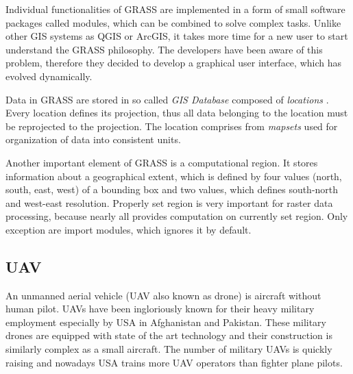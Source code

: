 \documentclass[a4paper,12pt]{article}
\newcommand{\term}[1]{
{\it #1}%
}
\begin{document}
Individual functionalities of GRASS are implemented in a form of small software packages called modules, which 
can be combined to solve complex tasks.
Unlike other GIS systems as QGIS or ArcGIS, it takes 
more time for a new user to start understand the GRASS philosophy. The developers 
have been aware of this problem, therefore they decided to develop a graphical user interface, which 
has evolved dynamically.


Data in GRASS are stored in so called  \term{GIS Database} composed of \term{locations}. Every location 
defines its projection, thus all data belonging to the location must be reprojected to the 
projection. The location comprises from \term{mapsets} used for organization 
of data into consistent units. 




Another important element of GRASS is a computational region. It stores information about a geographical
extent, which is defined by four values (north, south, east, west) of a bounding box and 
two values, which defines south-north and west-east resolution. Properly set region is 
very important for raster data processing, because nearly all provides computation 
on currently set region. Only exception are import modules, which ignores it by default.


\subsection{UAV}


An unmanned aerial vehicle (UAV also known as drone) is aircraft without human pilot.  UAVs have been ingloriously known for
their heavy military employment especially by USA in Afghanistan and Pakistan. These military drones are equipped with state of the art 
technology and their construction is similarly complex as a small aircraft.  
The number of military UAVs is quickly raising and nowadays USA trains more UAV operators than fighter plane pilots.
\end{document}
